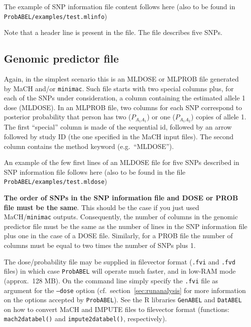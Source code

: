 \documentclass[12pt,a4paper]{article}
\newcommand{\GA}{\texttt{GenABEL}}
\newcommand{\DA}{\texttt{DatABEL}}
\begin{document}
The example of SNP information file content follows here (also
to be found in \texttt{ProbABEL/examples/test.mlinfo})


Note that a header line is present in the file. The file describes
five SNPs.

\subsection{Genomic predictor file}
\label{ssec:dosein}

Again, in the simplest scenario this is an MLDOSE or MLPROB file
generated by MaCH and/or \texttt{minimac}.  Such file starts with two
special columns plus, for each of the SNPs under consideration, a
column containing the estimated allele 1 dose (MLDOSE).  In an MLPROB
file, two columns for each SNP correspond to posterior probability
that person has two ($P_{A_1A_1}$) or one ($P_{A_1A_2}$) copies of
allele 1.  The first ``special'' column is made of the sequential id,
followed by an arrow followed by study ID (the one specified in the
MaCH input files). The second column contains the method keyword
(e.g.~``MLDOSE'').

An example of the few first lines of an MLDOSE file for
five SNPs described in SNP information file follows here (also
to be found in the file \texttt{ProbABEL/examples/test.mldose})




\textbf{The order of SNPs in the SNP information file and DOSE or PROB
  file must be the same}. This should be the case if you just used
MaCH/\texttt{minimac} outputs.
Consequently, the number of columns in the genomic predictor file
must be the same as the number of lines in the SNP information file
plus one in the case of a DOSE file. Similarly, for a PROB file the
number of columns must be equal to two times the number of SNPs plus
1.

The dose/probability file may be supplied in filevector format
(\texttt{.fvi} and \texttt{.fvd} files) in which case
\texttt{ProbABEL} will operate much faster, and in low-RAM mode
(approx.~128 MB). On the command line simply specify the \texttt{.fvi}
file as argument for the \texttt{--dose} option
(cf.~section~\ref{sec:runanalysis} for more information on the options
accepted by \texttt{ProbABEL}). See the R libraries \GA{} and
\DA{} on how to convert MaCH and IMPUTE files to
filevector format (functions: \texttt{mach2databel()} and
\texttt{impute2databel()}, respectively).
\end{document}
